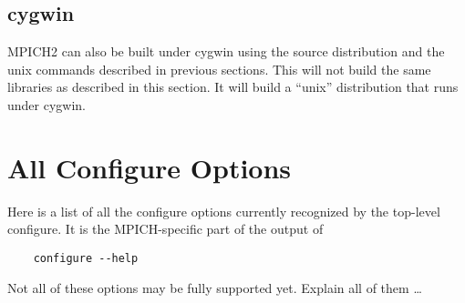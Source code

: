 \documentclass[dvipdfm,11pt]{article}
\begin{document}
\subsection{cygwin}
\label{sec:cygwin}

MPICH2 can also be built under cygwin using the source
distribution and the unix commands described in previous sections.  This
will not build the same libraries as described in this section.  It will 
build a ``unix'' distribution that runs under cygwin.

\section{All Configure Options}
\label{configure-options}
Here is a list of all the configure options currently recognized by the
top-level configure.  It is the MPICH-specific part of the output of 
\begin{verbatim}
    configure --help
\end{verbatim}
Not all of these options may be fully supported yet.  Explain all of them \ldots
\end{document}
